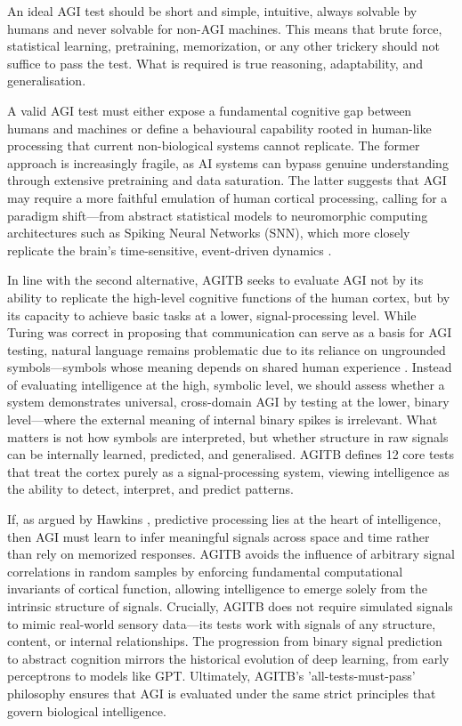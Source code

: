\documentclass{article}
\begin{document}
An ideal AGI test should be short and simple, intuitive, always solvable by humans and never solvable for non-AGI machines. This means that brute force, statistical learning, pretraining, memorization, or any other trickery should not suffice to pass the test. What is required is true reasoning, adaptability, and generalisation.

A valid AGI test must either expose a fundamental cognitive gap between humans and machines or define a behavioural capability rooted in human-like processing that current non-biological systems cannot replicate. The former approach is increasingly fragile, as AI systems can bypass genuine understanding through extensive pretraining and data saturation. The latter suggests that AGI may require a more faithful emulation of human cortical processing, calling for a paradigm shift—from abstract statistical models to neuromorphic computing architectures such as Spiking Neural Networks (SNN), which more closely replicate the brain's time-sensitive, event-driven dynamics \cite{Maass1997}.

In line with the second alternative, AGITB seeks to evaluate AGI not by its ability to replicate the high-level cognitive functions of the human cortex, but by its capacity to achieve basic tasks at a lower, signal-processing level. While Turing was correct in proposing that communication can serve as a basis for AGI testing, natural language remains problematic due to its reliance on ungrounded symbols—symbols whose meaning depends on shared human experience \cite{Harnad1990}. Instead of evaluating intelligence at the high, symbolic level, we should assess whether a system demonstrates universal, cross-domain AGI by testing at the lower, binary level—where the external meaning of internal binary spikes is irrelevant. What matters is not how symbols are interpreted, but whether structure in raw signals can be internally learned, predicted, and generalised. AGITB defines 12 core tests that treat the cortex purely as a signal-processing system, viewing intelligence as the ability to detect, interpret, and predict patterns. 

If, as argued by Hawkins \cite{Hawkins2004}, predictive processing lies at the heart of intelligence, then AGI must learn to infer meaningful signals across space and time rather than rely on memorized responses. AGITB avoids the influence of arbitrary signal correlations in random samples by enforcing fundamental computational invariants of cortical function, allowing intelligence to emerge solely from the intrinsic structure of signals. Crucially, AGITB does not require simulated signals to mimic real-world sensory data—its tests work with signals of any structure, content, or internal relationships. The progression from binary signal prediction to abstract cognition mirrors the historical evolution of deep learning, from early perceptrons to models like GPT. Ultimately, AGITB's 'all-tests-must-pass' philosophy ensures that AGI is evaluated under the same strict principles that govern biological intelligence.
\end{document}
